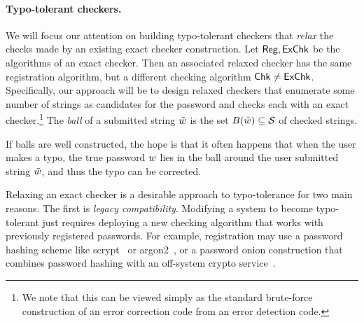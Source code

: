 \paragraph{Typo-tolerant checkers.} We will focus our attention on
building typo-tolerant checkers that {\em relax} the checks made by an
existing exact checker construction. Let $\textnormal{\textsf{Reg}}, \textnormal{\textsf{ExChk}}$ be the
algorithms of an exact checker. Then an associated relaxed checker has
the same registration algorithm, but a different checking algorithm
$\textnormal{\textsf{Chk}} \neq \textnormal{\textsf{ExChk}}$.  Specifically, our approach will be to
design relaxed checkers that enumerate some number of strings as
candidates for the password and checks each with an exact
checker.\footnote{We note that this can be viewed simply as the
  standard brute-force construction of an error correction code from
  an error detection code.}
The \emph{ball} of a submitted string
$\tilde{w}$ is the set $B(\tilde{w}) \subseteq \mathcal{S}$ of checked
strings. 

If balls are well constructed, the hope is that it often happens that when the user makes a typo, the true password ${w}$ lies in the ball around the user submitted string
$\tilde{w}$, and thus the typo can be corrected.




Relaxing an exact checker is a desirable approach to typo-tolerance
for two main reasons. The first is {\em legacy compatibility}. Modifying a system to
become typo-tolerant just requires deploying a new checking
algorithm that works with previously registered passwords.  For
example, registration may use a password hashing scheme like
scrypt~\cite{percival2015scrypt} or argon2~\cite{biryukov2015argon}, or 
a password onion construction that combines password hashing with an
off-system crypto service~\cite{everspaugh2015pythia}.

